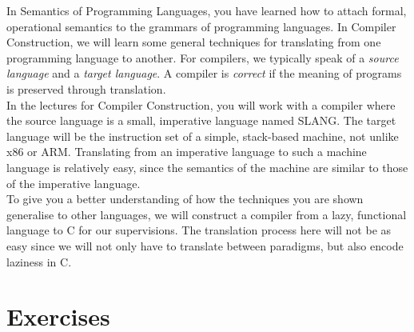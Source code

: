 \documentclass[10pt,a4paper]{exam} %
\begin{document}
\begin{center}
\parbox[c]{340pt}{

In {Semantics of Programming Languages}, you have learned how to attach formal, operational semantics to the grammars of programming languages. In {Compiler Construction}, we will learn some general techniques for translating from one programming language to another. For compilers, we typically speak of a \emph{source language} and a \emph{target language}. A compiler is \emph{correct} if the meaning of programs is preserved through translation. \\

In the lectures for Compiler Construction, you will work with a compiler where the source language is a small, imperative language named SLANG. The target language will be the instruction set of a simple, stack-based machine, not unlike x86 or ARM. Translating from an imperative language to such a machine language is relatively easy, since the semantics of the machine are similar to those of the imperative language. \\

To give you a better understanding of how the techniques you are shown generalise to other languages, we will construct a compiler from a lazy, functional language to C for our supervisions. The translation process here will not be as easy since we will not only have to translate between paradigms, but also encode laziness in C. 
}
\end{center}

\section*{Exercises}
\end{document}
